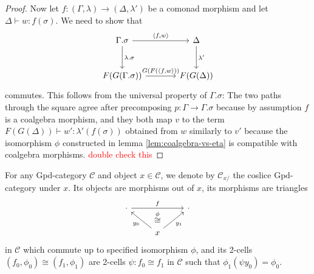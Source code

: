 \documentclass[a4paper]{article}
\newcommand{\todo}[1]{\textcolor{red}{#1}}
\newtheorem{lemma}[theorem]{Lemma}
\theoremstyle{remark}
\theoremstyle{definition}
\begin{document}
\begin{proof}
  Now let $f : (\Gamma, \lambda) \rightarrow (\Delta, \lambda')$ be a comonad morphism and let $\Delta \vdash w : f(\sigma)$.
  We need to show that
  \begin{equation}
    \begin{tikzcd}[column sep=large, row sep=large]
      \Gamma.\sigma \arrow[r, "{\langle f, w \rangle}"] \arrow[d, "\lambda.\sigma"] & \Delta \arrow[d, "\lambda'"] \\
      F(G(\Gamma.\sigma)) \arrow[r, "{G(F(\langle f, w \rangle}))"] & F(G(\Delta))
    \end{tikzcd}
  \end{equation}
  commutes.
  This follows from the universal property of $\Gamma.\sigma$:
  The two paths through the square agree after precomposing $p : \Gamma \rightarrow \Gamma.\sigma$ because by assumption $f$ is a coalgebra morphism, and they both map $v$ to the term $F(G(\Delta)) \vdash w' : \lambda'(f(\sigma))$ obtained from $w$ similarly to $v'$ because the isomorphism $\phi$ constructed in lemma \ref{lem:coalgebra-vs-eta} is compatible with coalgebra morphisms.
  \todo{double check this}
\end{proof}


For any $\mathrm{Gpd}$-category $\mathcal{C}$ and object $x \in \mathcal{C}$, we denote by $\mathcal{C}_{x / }$ the coslice $\mathrm{Gpd}$-category under $x$.
Its objects are morphisms out of $x$, its morphisms are triangles
\begin{equation}
  \begin{tikzcd}
    \cdot \arrow[rr, "f"] & \, & \cdot \\
    & x \arrow[ul, "y_0"] \arrow[ur, "y_1"'] \arrow[u, "\overset{\phi}{\cong}", phantom, near end]
  \end{tikzcd}
\end{equation}
in $\mathcal{C}$ which commute up to specified isomorphism $\phi$, and its 2-cells $(f_0, \phi_0) \cong (f_1, \phi_1)$ are 2-cells $\psi : f_0 \cong f_1$ in $\mathcal{C}$ such that $\phi_1 (\psi y_0) = \phi_0$.
\end{document}
